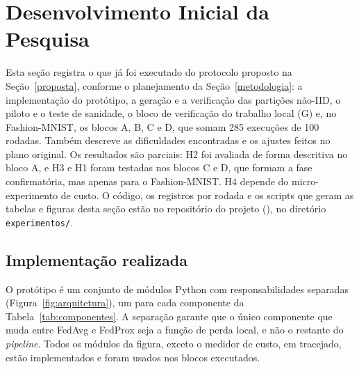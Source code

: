 \section{Desenvolvimento Inicial da Pesquisa}
\label{desenvolvimento}

Esta seção registra o que já foi executado do protocolo proposto na Seção~\ref{proposta}, conforme o planejamento da Seção~\ref{metodologia}: a implementação do protótipo, a geração e a verificação das partições não-IID, o piloto e o teste de sanidade, o bloco de verificação do trabalho local (G) e, no Fashion-MNIST, os blocos A, B, C e D, que somam 285 execuções de 100 rodadas. Também descreve as dificuldades encontradas e os ajustes feitos no plano original. Os resultados são parciais: H2 foi avaliada de forma descritiva no bloco A, e H3 e H1 foram testadas nos blocos C e D, que formam a fase confirmatória, mas apenas para o Fashion-MNIST. H4 depende do micro-experimento de custo. O código, os registros por rodada e os scripts que geram as tabelas e figuras desta seção estão no repositório do projeto (\linkProjeto), no diretório \texttt{experimentos/}.

\subsection{Implementação realizada}

O protótipo é um conjunto de módulos Python com responsabilidades separadas (Figura~\ref{fig:arquitetura}), um para cada componente da Tabela~\ref{tab:componentes}. A separação garante que o único componente que muda entre FedAvg e FedProx seja a função de perda local, e não o restante do \textit{pipeline}. Todos os módulos da figura, exceto o medidor de custo, em tracejado, estão implementados e foram usados nos blocos executados.

